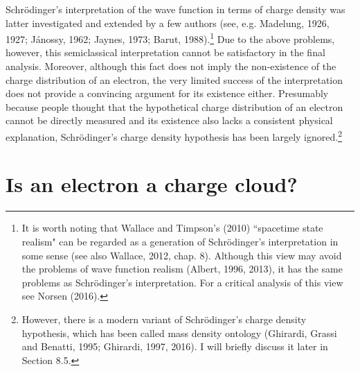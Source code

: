 Schr\"{o}dinger's interpretation of the wave function in terms of charge density was latter investigated and extended by a few authors (see, e.g. Madelung, 1926, 1927; J\'{a}nossy, 1962; Jaynes, 1973; Barut, 1988).\footnote{It is worth noting that Wallace and Timpson's (2010) ``spacetime state realism" can be regarded as a generation of Schr\"{o}dinger's interpretation in some sense (see also Wallace, 2012, chap. 8). Although this view may avoid the problems of wave function realism (Albert, 1996, 2013), it has the same problems as Schr\"{o}dinger's interpretation. For a critical analysis of this view see Norsen (2016).}  %
Due to the above problems, however, this semiclassical interpretation cannot be satisfactory in the final analysis. Moreover, although this fact does not imply the non-existence of the charge distribution of an electron, the very limited success of the interpretation does not provide a convincing argument for its existence either. Presumably because people thought that the hypothetical charge distribution of an electron cannot be directly measured and its existence also lacks a consistent physical explanation, Schr\"{o}dinger's charge density hypothesis has been largely ignored.\footnote{However, there is a modern variant of Schr\"{o}dinger's charge density hypothesis, which has been called mass density ontology (Ghirardi, Grassi and Benatti, 1995; Ghirardi, 1997, 2016). I will briefly discuss it later in Section 8.5.}


\section{Is an electron a charge cloud?}

